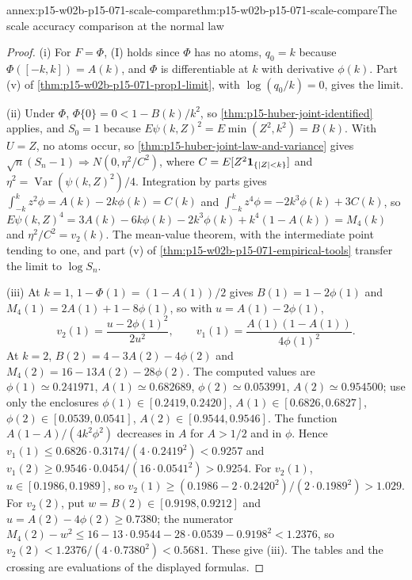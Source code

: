 \begin{annexitem}{annex:p15-w02b-p15-071-scale-compare}{thm:p15-w02b-p15-071-scale-compare}{The scale accuracy comparison at the normal law}
\begin{proof}
(i) For \(F=\Phi\), (I) holds since \(\Phi\) has no atoms,
\(q_0=k\) because \(\Phi([-k,k])=A(k)\), and \(\Phi\) is differentiable
at \(k\) with derivative \(\phi(k)\). Part (v) of
\cref{thm:p15-w02b-p15-071-prop1-limit}, with \(\log(q_0/k)=0\), gives
the limit.

(ii) Under \(\Phi\), \(\Phi\{0\}=0<1-B(k)/k^2\), so
\cref{thm:p15-huber-joint-identified} applies, and \(S_0=1\) because
\(E\psi(k,Z)^2=E\min(Z^2,k^2)=B(k)\). With \(U=Z\), no atoms occur, so
\cref{thm:p15-huber-joint-law-and-variance} gives
\(\sqrt n(S_n-1)\Rightarrow N(0,\eta^2/C^2)\), where
\(C=E[Z^2{\bf1}_{\{|Z|<k\}}]\) and
\(\eta^2=\operatorname{Var}(\psi(k,Z)^2)/4\). Integration by parts gives
\(\int_{-k}^kz^2\phi=A(k)-2k\phi(k)=C(k)\) and
\(\int_{-k}^kz^4\phi=-2k^3\phi(k)+3C(k)\), so
\(E\psi(k,Z)^4=3A(k)-6k\phi(k)-2k^3\phi(k)+k^4(1-A(k))=M_4(k)\) and
\(\eta^2/C^2=v_2(k)\). The mean-value theorem, with the intermediate
point tending to one, and part (v) of
\cref{thm:p15-w02b-p15-071-empirical-tools} transfer the limit to
\(\log S_n\).

(iii) At \(k=1\), \(1-\Phi(1)=(1-A(1))/2\) gives \(B(1)=1-2\phi(1)\) and
\(M_4(1)=2A(1)+1-8\phi(1)\), so with \(u=A(1)-2\phi(1)\),
\[
 v_2(1)=\frac{u-2\phi(1)^2}{2u^2},\qquad
 v_1(1)=\frac{A(1)(1-A(1))}{4\phi(1)^2}.
\]
At \(k=2\), \(B(2)=4-3A(2)-4\phi(2)\) and \(M_4(2)=16-13A(2)-28\phi(2)\).
The computed values are \(\phi(1)\simeq0.241971\),
\(A(1)\simeq0.682689\), \(\phi(2)\simeq0.053991\),
\(A(2)\simeq0.954500\); use only the enclosures
\(\phi(1)\in[0.2419,0.2420]\), \(A(1)\in[0.6826,0.6827]\),
\(\phi(2)\in[0.0539,0.0541]\), \(A(2)\in[0.9544,0.9546]\).
The function \(A(1-A)/(4k^2\phi^2)\) decreases in \(A\) for \(A>1/2\)
and in \(\phi\). Hence \(v_1(1)\leq0.6826\cdot0.3174/(4\cdot0.2419^2)
<0.9257\) and
\(v_1(2)\geq0.9546\cdot0.0454/(16\cdot0.0541^2)>0.9254\).
For \(v_2(1)\), \(u\in[0.1986,0.1989]\), so
\(v_2(1)\geq(0.1986-2\cdot0.2420^2)/(2\cdot0.1989^2)>1.029\).
For \(v_2(2)\), put \(w=B(2)\in[0.9198,0.9212]\) and
\(u=A(2)-4\phi(2)\geq0.7380\); the numerator
\(M_4(2)-w^2\leq16-13\cdot0.9544-28\cdot0.0539-0.9198^2<1.2376\), so
\(v_2(2)<1.2376/(4\cdot0.7380^2)<0.5681\). These give (iii).
The tables and the crossing are evaluations of the displayed formulas.
\end{proof}
\end{annexitem}

